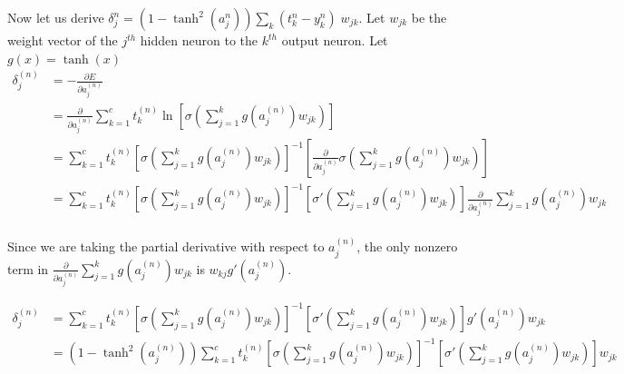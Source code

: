 \begin{enumerate}[label=(\alph*)]
	      \begin{tcolorbox}
		      \begin{tcolorbox}[title={Hidden Layer Derivation}]
			      Now let us derive
			      $\delta_{j}^{n} = (1-\tanh^2(a_j^n)) \sum_k
				      (t_k^n - y_{k}^n)\;w_{jk}$. Let $w_{jk}$ be the weight
			      vector of the $j^{th}$ hidden neuron to the $k^{th}$
			      output neuron. Let $g(x) = \tanh (x)$
			      \begin{align*}
				      \delta_j^{(n)} & = - \frac{\partial E}{\partial a_j^{(n)}}           \\
				                     & = \frac{\partial }{\partial a_j^{(n)}}
				      \sum_{k=1}^c t_k^{(n)} \ln \left[ \sigma\left(\sum_{j =
				      1}^{k} g \left( a_j^{(n)}\right)w_{jk}\right) \right]                \\
				                     & =  \sum_{k=1}^c t_k^{(n)}
				      \left[\sigma\left(\sum_{j = 1}^{k}
				      g\left(a_j^{(n)}\right)w_{jk}\right)\right]^{-1} \left[
				      \frac{\partial }{\partial a_j^{(n)}}
				      \sigma\left(\sum_{j = 1}^{k}
				      g\left(a_j^{(n)}\right)w_{jk}\right) \right]                         \\
				                     & =  \sum_{k=1}^c t_k^{(n)} \left[\sigma\left(\sum_{j
					      = 1}^{k} g\left(a_j^{(n)}\right)w_{jk}\right)\right]^{-1} \left[
				      \sigma'\left(\sum_{j = 1}^{k}
				      g\left(a_j^{(n)}\right)w_{jk}\right) \right]
				      \frac{\partial }{\partial a_j^{(n)}} \sum_{j = 1}^{k}
				      g\left(a_j^{(n)}\right)w_{jk}                                        \\
			      \end{align*}

			      Since we are taking the partial derivative with respect to
			      $a_j^{(n)}$, the only nonzero term in $\frac{\partial
				      }{\partial a_j^{(n)}} \sum_{j = 1}^{k}
				      g\left(a_j^{(n)}\right)w_{jk}$
			      is $w_{kj} g'(a_j^{(n)})$.

			      \begin{align*}
				      \delta_j^{(n)} & =  \sum_{k=1}^c t_k^{(n)} \left[\sigma\left(\sum_{j
					      = 1}^{k} g\left(a_j^{(n)}\right)w_{jk}\right)\right]^{-1} \left[
				      \sigma'\left(\sum_{j = 1}^{k}
				      g\left(a_j^{(n)}\right)w_{jk}\right) \right]
				      g'\left(a_j^{(n)}\right)w_{jk}                                                                 \\
				                     & =  (1 - \tanh^2 (a_j^{(n)})) \sum_{k=1}^c t_k^{(n)} \left[\sigma\left(\sum_{j
					      = 1}^{k} g\left(a_j^{(n)}\right)w_{jk}\right)\right]^{-1} \left[
				      \sigma'\left(\sum_{j = 1}^{k}
				      g\left(a_j^{(n)}\right)w_{jk}\right) \right] w_{jk}
			      \end{align*}


\end{tcolorbox}
\end{tcolorbox}
\end{enumerate}
